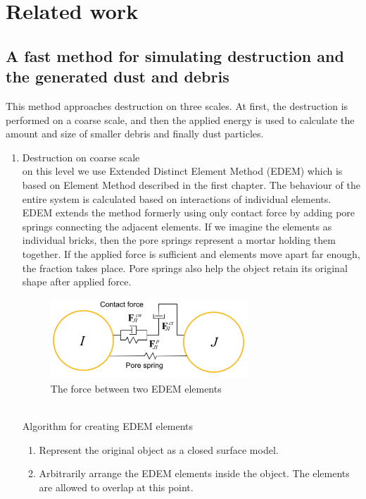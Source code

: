 \chapter{Related work}

\section{A fast method for simulating destruction and the generated dust
and debris}
This method \cite{edem} approaches destruction on three scales. At first, the destruction is performed on a coarse scale, and then the applied energy is used to calculate the amount and size of smaller debris and finally dust particles.

\begin{enumerate}
\item Destruction on coarse scale \\ on this level we use Extended Distinct Element Method (EDEM) which is based on Element Method described in the first chapter. The behaviour of the entire system is calculated based on interactions of individual elements. EDEM extends the method formerly using only contact force by adding pore springs connecting the adjacent elements. If we imagine the elements as individual bricks, then the pore springs represent a mortar holding them together. If the applied force is sufficient and elements move apart far enough, the fraction takes place. Pore springs also help the object retain its original shape after applied force.
\begin{figure}[ht!]
        \centering
        \includegraphics[width=0.7\textwidth]{img/spring}
        \caption{The force between two EDEM elements \cite{edem}}
        \label{spring}
\end{figure}
\\Algorithm for creating EDEM elements
\begin{enumerate}
\item Represent the original object as a closed surface model.
\item Arbitrarily arrange the EDEM elements inside the object.
The elements are allowed to overlap at this point.

\end{enumerate}
\end{enumerate}

